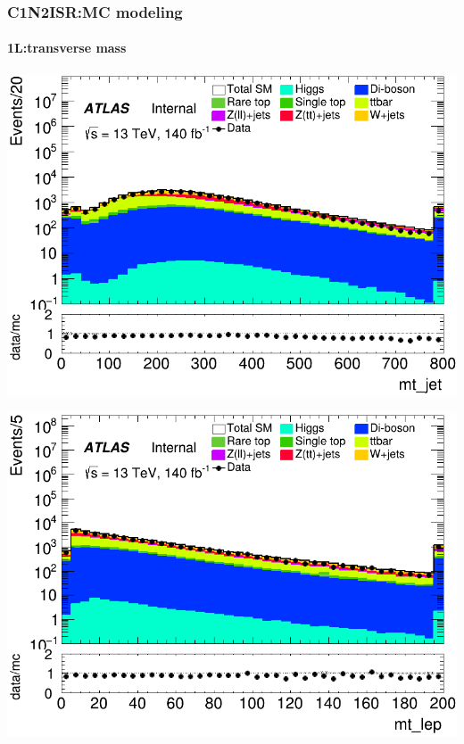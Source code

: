 \documentclass[usenames,dvipsnames]{beamer}
\begin{document}
\begin{frame}
\frametitle{C1N2ISR:MC modeling}
\framesubtitle{1L:\quad transverse mass}
    \begin{minipage}{0.32\textwidth}
        \centering
        \includegraphics[width=\textwidth]{graphics/L_met/L_met_mt_jet.png}
    \end{minipage}
    \hfill
    \begin{minipage}{0.32\textwidth}
        \centering
        \includegraphics[width=\textwidth]{graphics/L_met/L_met_mt_lep.png}
    \end{minipage}
    \hfill
    \begin{minipage}{0.32\textwidth}
        \centering

\end{minipage}
\end{frame}
\end{document}
